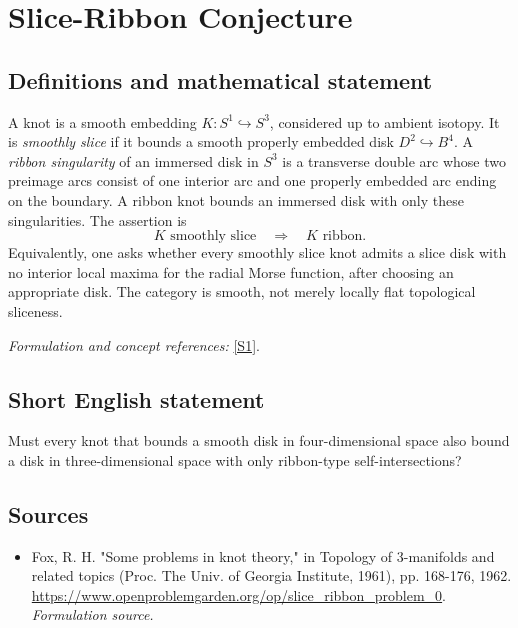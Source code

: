 \documentclass[11pt]{article}
\begin{document}
\section*{\texorpdfstring{Slice-Ribbon Conjecture}{Slice-Ribbon Conjecture}}\label{301}
\subsection{Definitions and mathematical statement}
A knot is a smooth embedding $K:S^1\hookrightarrow S^3$, considered up to ambient isotopy. It is \emph{smoothly slice} if it bounds a smooth properly embedded disk $D^2\hookrightarrow B^4$. A \emph{ribbon singularity} of an immersed disk in $S^3$ is a transverse double arc whose two preimage arcs consist of one interior arc and one properly embedded arc ending on the boundary. A ribbon knot bounds an immersed disk with only these singularities. The assertion is
\[
 K\text{ smoothly slice}\quad\Longrightarrow\quad K\text{ ribbon}.
\]
Equivalently, one asks whether every smoothly slice knot admits a slice disk with no interior local maxima for the radial Morse function, after choosing an appropriate disk. The category is smooth, not merely locally flat topological sliceness.
\par\smallskip\textit{Formulation and concept references:} \href{https://www.openproblemgarden.org/op/slice_ribbon_problem_0}{[S1]}.

\subsection{Short English statement}
Must every knot that bounds a smooth disk in four-dimensional space also bound a disk in three-dimensional space with only ribbon-type self-intersections?
\subsection{Sources}
\begin{itemize}
\item[S1]Fox, R. H. "Some problems in knot theory," in Topology of 3-manifolds and related topics (Proc. The Univ. of Georgia Institute, 1961), pp. 168-176, 1962.
\url{https://www.openproblemgarden.org/op/slice_ribbon_problem_0}.
\textit{Formulation source.}
\end{itemize}
\end{document}
